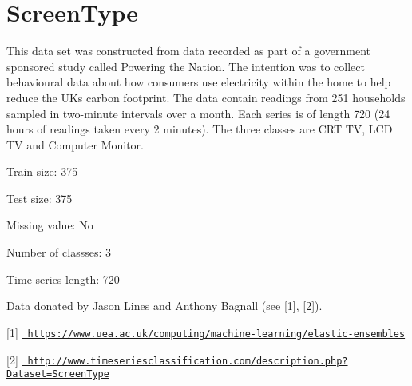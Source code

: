 \chapter{Screen\+Type}
\hypertarget{md_external_2data_2UCRArchive__2018_2ScreenType_2README}{}\label{md_external_2data_2UCRArchive__2018_2ScreenType_2README}
\label{md_external_2data_2UCRArchive__2018_2ScreenType_2README_autotoc_md189}%
%
 This data set was constructed from data recorded as part of a government sponsored study called Powering the Nation. The intention was to collect behavioural data about how consumers use electricity within the home to help reduce the UK\textquotesingle{}s carbon footprint. The data contain readings from 251 households sampled in two-\/minute intervals over a month. Each series is of length 720 (24 hours of readings taken every 2 minutes). The three classes are CRT TV, LCD TV and Computer Monitor.

Train size\+: 375

Test size\+: 375

Missing value\+: No

Number of classses\+: 3

Time series length\+: 720

Data donated by Jason Lines and Anthony Bagnall (see \mbox{[}1\mbox{]}, \mbox{[}2\mbox{]}).

\mbox{[}1\mbox{]} \href{https://www.uea.ac.uk/computing/machine-learning/elastic-ensembles}{\texttt{ https\+://www.\+uea.\+ac.\+uk/computing/machine-\/learning/elastic-\/ensembles}}

\mbox{[}2\mbox{]} \href{http://www.timeseriesclassification.com/description.php?Dataset=ScreenType}{\texttt{ http\+://www.\+timeseriesclassification.\+com/description.\+php?\+Dataset=\+Screen\+Type}} 